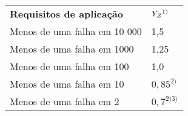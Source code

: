 \begin{table}
\centering
{}
\begin{tabular}{ll}
\textbf{Requisitos de aplicação}      & \textbf{}$Y_Z \\ ^{1)}$    \\
Menos de uma falha em 10 000 & 1,5       \\
Menos de uma falha em 1000   & 1,25      \\
Menos de uma falha em 100    & 1,0       \\
Menos de uma falha em 10     & $0,85 ^{2)}$   \\
Menos de uma falha em 2      & $0,7^{2) 3)}$
\end{tabular}
\end{table}